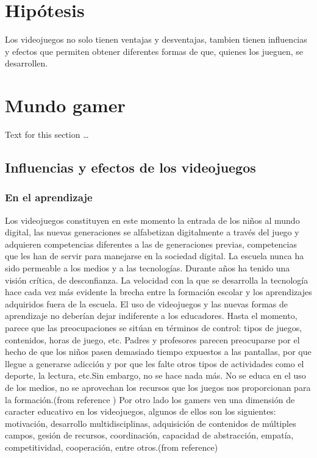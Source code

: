 \documentclass{bmcart}
\begin{document}
\section*{Hipótesis}
Los videojuegos no solo tienen ventajas y desventajas, tambien tienen influencias y efectos que permiten obtener diferentes formas de que, quienes los jueguen, se desarrollen. %

\section*{Mundo gamer}
Text for this section \ldots

\subsection*{Influencias y efectos de los videojuegos}
\cite{juegoycine}

\subsubsection*{En el aprendizaje}
Los videojuegos constituyen en este momento la entrada de los niños al mundo digital, las nuevas generaciones se alfabetizan digitalmente a través del juego y adquieren competencias diferentes a las de generaciones previas, competencias que les han de servir para manejarse en la sociedad digital.
\newline
La escuela nunca ha sido permeable a los medios y a las tecnologías.
Durante años ha tenido una visión crítica, de desconfianza. La velocidad con la que se desarrolla la tecnología hace cada vez más evidente la brecha entre la formación escolar y los aprendizajes adquiridos fuera de la escuela.
\newline
El uso de videojuegos y las nuevas formas de aprendizaje no deberían dejar indiferente a los educadores. Hasta el momento, parece que las preocupaciones se sitúan en términos de control: tipos de juegos, contenidos, horas de juego, etc. Padres y profesores parecen preocuparse por el hecho de que los niños pasen demasiado tiempo expuestos a las pantallas, por que llegue a generarse adicción y por que les falte otros tipos de actividades como el deporte, la lectura, etc.Sin embargo, no se hace nada más. No se educa en el uso de los medios, no se aprovechan los recursos que los juegos nos proporcionan para la formación.(from reference \cite{salvat2008videojuegos})
\newline
Por otro lado los gamers ven una dimensión de caracter educativo en los videojuegos, algunos de ellos son los siguientes: motivación, desarrollo multidisciplinas, adquisición de contenidos de múltiples campos, gesión de recursos, coordinación, capacidad de abstracción, empatía, competitividad, cooperación, entre otros.(from reference\cite{dominguez2012que})
\newline
\newline
\end{document}
